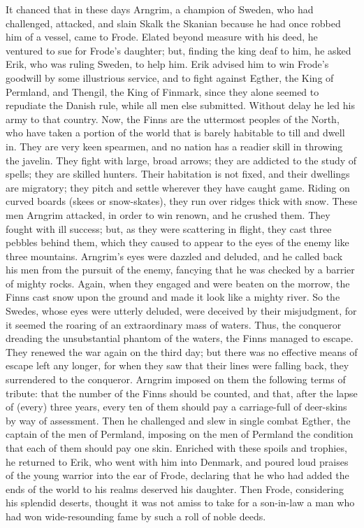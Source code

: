 \documentclass[10pt,a4paper]{report}
\begin{document}
It chanced that in these days Arngrim, a champion of Sweden, who had challenged, attacked, and slain Skalk the Skanian because he had once robbed him of a vessel, came to Frode. Elated beyond measure with his deed, he ventured to sue for Frode's daughter; but, finding the king deaf to him, he asked Erik, who was ruling Sweden, to help him. Erik advised him to win Frode's goodwill by some illustrious service, and to fight against Egther, the King of Permland, and Thengil, the King of Finmark, since they alone seemed to repudiate the Danish rule, while all men else submitted. Without delay he led his army to that country. Now, the Finns are the uttermost peoples of the North, who have taken a portion of the world that is barely habitable to till and dwell in. They are very keen spearmen, and no nation has a readier skill in throwing the javelin. They fight with large, broad arrows; they are addicted to the study of spells; they are skilled hunters. Their habitation is not fixed, and their dwellings are migratory; they pitch and settle wherever they have caught game. Riding on curved boards (skees or snow-skates), they run over ridges thick with snow. These men Arngrim attacked, in order to win renown, and he crushed them. They fought with ill success; but, as they were scattering in flight, they cast three pebbles behind them, which they caused to appear to the eyes of the enemy like three mountains. Arngrim's eyes were dazzled and deluded, and he called back his men from the pursuit of the enemy, fancying that he was checked by a barrier of mighty rocks. Again, when they engaged and were beaten on the morrow, the Finns cast snow upon the ground and made it look like a mighty river. So the Swedes, whose eyes were utterly deluded, were deceived by their misjudgment, for it seemed the roaring of an extraordinary mass of waters. Thus, the conqueror dreading the unsubstantial phantom of the waters, the Finns managed to escape. They renewed the war again on the third day; but there was no effective means of escape left any longer, for when they saw that their lines were falling back, they surrendered to the conqueror. Arngrim imposed on them the following terms of tribute: that the number of the Finns should be counted, and that, after the lapse of (every) three years, every ten of them should pay a carriage-full of deer-skins by way of assessment. Then he challenged and slew in single combat Egther, the captain of the men of Permland, imposing on the men of Permland the condition that each of them should pay one skin. Enriched with these spoils and trophies, he returned to Erik, who went with him into Denmark, and poured loud praises of the young warrior into the ear of Frode, declaring that he who had added the ends of the world to his realms deserved his daughter. Then Frode, considering his splendid deserts, thought it was not amiss to take for a son-in-law a man who had won wide-resounding fame by such a roll of noble deeds.\\
\end{document}
